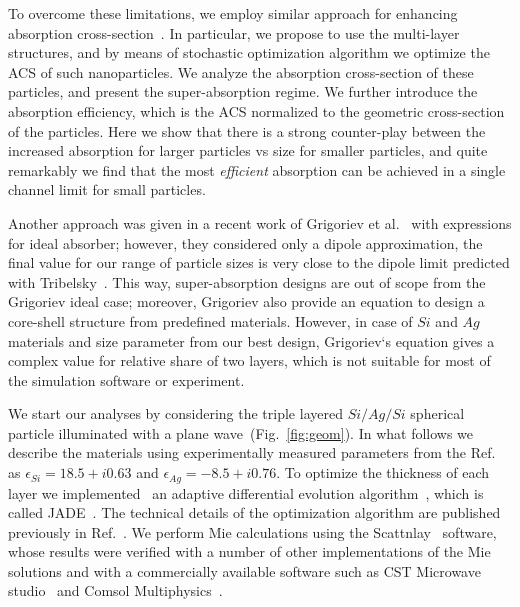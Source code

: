 \documentclass[aps,prl,twocolumn,showpacs,superscriptaddress,groupedaddress]{revtex4-1}
\begin{document}
To overcome these limitations, we employ similar approach for
enhancing absorption cross-section~\cite{Fan-2011}. In particular, we
propose to use the multi-layer structures, and by means of stochastic
optimization algorithm we optimize the ACS of such nanoparticles. We
analyze the absorption cross-section of these particles, and present
the super-absorption regime. We further introduce the absorption
efficiency, which is the ACS normalized to the geometric cross-section
of the particles. Here we show that there is a strong counter-play
between the increased absorption for larger particles vs size for
smaller particles, and quite remarkably we find that the most {\em
  efficient} absorption can be achieved in a single channel limit for
small particles.

Another approach was given in a recent work of Grigoriev et
al.~\cite{Grigoriev-2015} with expressions for ideal absorber;
however, they considered only a dipole approximation, the final value
for our range of particle sizes is very close to the dipole limit
predicted with Tribelsky~\cite{Tribelsky-2011}.  This way,
super-absorption designs are out of scope from the Grigoriev ideal
case; moreover, Grigoriev also provide an equation to design a
core-shell structure from predefined materials. However, in case of
$Si$ and $Ag$ materials and size parameter from our best design,
Grigoriev`s equation gives a complex value for relative share of two
layers, which is not suitable for most of the simulation software or
experiment.


\begin{figure}
\end{figure}


We start our analyses by considering the triple layered $Si/Ag/Si$
spherical particle illuminated with a plane
wave~(Fig.~\ref{fig:geom}). In what follows we describe the materials
using experimentally measured parameters from the
Ref.~\cite{palik-1997} as $\epsilon_{Si} = 18.5 + i0.63$ and
$\epsilon_{Ag} = -8.5 + i0.76$.  To optimize the thickness of each
layer we implemented~\cite{JADE-web} an adaptive differential
evolution algorithm~\cite{Storn-DE-first-1997}, which is called
JADE~\cite{Jingqiao-JADE-2009}.  The technical details of the
optimization algorithm are published previously in
Ref.~\cite{Ladutenko-2014}. We perform Mie calculations using the
Scattnlay~\cite{Pena-scattnlay-2009,Scattnlay-web} software, whose
results were verified with a number of other implementations of the
Mie solutions and with a commercially available software such as CST
Microwave studio~\cite{CST-web} and Comsol
Multiphysics~\cite{Comsol-web}.
\end{document}
